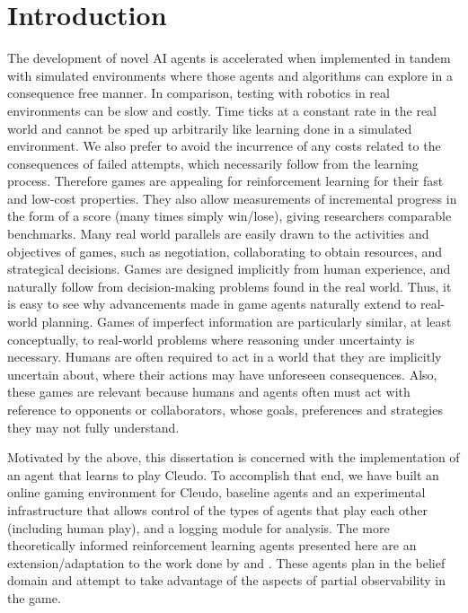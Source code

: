 \documentclass[msc, ai, logo, twoside, notimes, parskip, leftchapter, normalheadings]{infthesis}
\begin{document}
\chapter{Introduction}
The development of novel AI agents is accelerated when implemented in tandem with simulated environments where those agents and algorithms can explore in a consequence free manner. In comparison, testing with robotics in real environments can be slow and costly. Time ticks at a constant rate in the real world and cannot be sped up arbitrarily like learning done in a simulated environment. We also prefer to avoid the incurrence of any costs related to the consequences of failed attempts, which necessarily follow from the learning process. Therefore games are appealing for reinforcement learning for their fast and low-cost properties. They also allow measurements of incremental progress in the form of a score (many times simply win/lose), giving researchers comparable benchmarks. Many real world parallels are easily drawn to the activities and objectives of games, such as negotiation, collaborating to obtain resources, and strategical decisions. Games are designed implicitly from human experience, and naturally follow from decision-making problems found in the real world. Thus, it is easy to see why advancements made in game agents naturally extend to real-world planning. Games of imperfect information are particularly similar, at least conceptually, to real-world problems where reasoning under uncertainty is necessary. Humans are often required to act in a world that they are implicitly uncertain about, where their actions may have unforeseen consequences. Also, these games are relevant because humans and agents often must act with reference to opponents or collaborators, whose goals, preferences and strategies they may not fully understand. 

Motivated by the above, this dissertation is concerned with the implementation of an agent that learns to play Cleudo. To accomplish that end, we have built an online gaming environment for Cleudo, baseline agents and an experimental infrastructure that allows control of the types of agents that play each other (including human play), and a logging module for analysis. The more theoretically informed reinforcement learning agents presented here are an extension/adaptation to the work done by \citep{Silver-veness} and \citep{Mihai}. These agents plan in the belief domain and attempt to take advantage of the aspects of partial observability in the game. 
\end{document}
